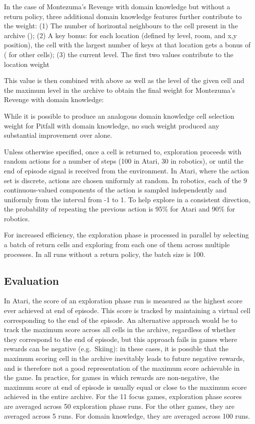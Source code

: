 \documentclass{nature}
\begin{document}
\begin{methods}
In the case of Montezuma's Revenge with domain knowledge but without a return policy, three additional domain knowledge features further contribute to the weight: 
(1) The number of horizontal neighbours to the cell present in the archive (); 
(2) A key bonus: for each location (defined by level, room, and x,y position), the cell with the largest number of keys at that location gets a bonus of  ( for other cells);
(3) the current level. The first two values contribute to the location weight

This value is then combined with  above as well as the level of the given cell  and the maximum level in the archive  to obtain the final weight for Montezuma's Revenge with domain knowledge:

While it is possible to produce an analogous domain knowledge cell selection weight for Pitfall with domain knowledge, no such weight produced any substantial improvement over  alone.

Unless otherwise specified, once a cell is returned to, exploration proceeds with random actions for a number of steps (100 in Atari, 30 in robotics), or until the end of episode signal is received from the environment. In Atari, where the action set is discrete, actions are chosen uniformly at random. In robotics, each of the 9 continuous-valued components of the action is sampled independently and uniformly from the interval from -1 to 1. To help explore in a consistent direction, the probability of repeating the previous action is 95\% for Atari and 90\% for robotics.

For increased efficiency, the exploration phase is processed in parallel by selecting a batch of return cells and exploring from each one of them across multiple processes. In all runs without a return policy, the batch size is 100. 


\subsection{Evaluation}
\label{sec:evaluation}

In Atari, the score of an exploration phase run is measured as the highest score ever achieved at end of episode. This score is tracked by maintaining a virtual cell corresponding to the end of the episode.
An alternative approach would be to track the maximum score across all cells in the archive, regardless of whether they correspond to the end of episode, but this approach fails in games where rewards can be negative (e.g.~Skiing): in these cases, it is possible that the maximum scoring cell in the archive inevitably leads to future negative rewards, and is therefore not a good representation of the maximum score achievable in the game.
In practice, for games in which rewards are non-negative, the maximum score at end of episode is usually equal or close to the maximum score achieved in the entire archive.
For the 11 focus games, exploration phase scores are averaged across 50 exploration phase runs. For the other games, they are averaged across 5 runs. For domain knowledge, they are averaged across 100 runs.


\end{methods}
\end{document}
